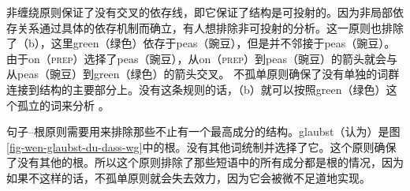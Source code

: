 \noindent
非缠绕原则保证了没有交叉的依存线，即它保证了结构是可投射的\citep[]{Hudson2000a}。因为非局部依存关系通过具体的依存机制而确立，有人想排除非可投射的分析。这一原则也排除了（b），这里green（绿色）依存于peas（豌豆），但是并不邻接于peas（豌豆）。由于on（\textsc{prep}）选择了peas（豌豆），从on（\textsc{prep}）到peas（豌豆）的箭头就会与从peas（豌豆）到green（绿色）的箭头交叉。
\eal
{}
\zl
不孤单原则确保了没有单独的词群连接到结构的主要部分上。没有这条规则的话，（b）就可以按照green（绿色）这个孤立的词来分析 \citep[]{Hudson2000a}。

句子--根原则需要用来排除那些不止有一个最高成分的结构。glaubst（认为）是图\ref{fig-wen-glaubst-du-dass-wg}中的根。没有其他词统制并选择了它。这个原则确保了没有其他的根。所以这个原则排除了那些短语中的所有成分都是根的情况，因为如果不这样的话，不孤单原则就会失去效力，因为它会被微不足道地实现\citep[]{Hudson2000a}。

